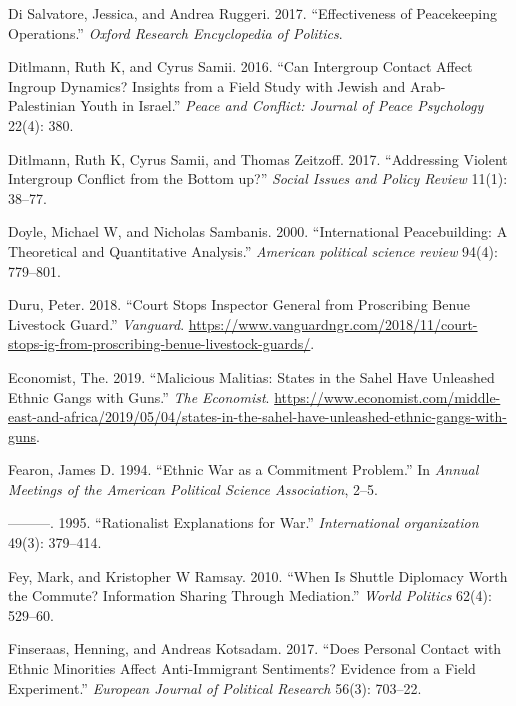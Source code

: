 \documentclass[11pt]{article}
\begin{document}
\hypertarget{ref-di2017effectiveness}{}
Di Salvatore, Jessica, and Andrea Ruggeri. 2017. ``Effectiveness of
Peacekeeping Operations.'' \emph{Oxford Research Encyclopedia of
Politics}.

\hypertarget{ref-ditlmann2016can}{}
Ditlmann, Ruth K, and Cyrus Samii. 2016. ``Can Intergroup Contact Affect
Ingroup Dynamics? Insights from a Field Study with Jewish and
Arab-Palestinian Youth in Israel.'' \emph{Peace and Conflict: Journal of
Peace Psychology} 22(4): 380.

\hypertarget{ref-ditlmann2017addressing}{}
Ditlmann, Ruth K, Cyrus Samii, and Thomas Zeitzoff. 2017. ``Addressing
Violent Intergroup Conflict from the Bottom up?'' \emph{Social Issues
and Policy Review} 11(1): 38--77.

\hypertarget{ref-doyle2000international}{}
Doyle, Michael W, and Nicholas Sambanis. 2000. ``International
Peacebuilding: A Theoretical and Quantitative Analysis.'' \emph{American
political science review} 94(4): 779--801.

\hypertarget{ref-duru2018court}{}
Duru, Peter. 2018. ``Court Stops Inspector General from Proscribing
Benue Livestock Guard.'' \emph{Vanguard}.
\url{https://www.vanguardngr.com/2018/11/court-stops-ig-from-proscribing-benue-livestock-guards/}.

\hypertarget{ref-economist2019militias}{}
Economist, The. 2019. ``Malicious Malitias: States in the Sahel Have
Unleashed Ethnic Gangs with Guns.'' \emph{The Economist}.
\url{https://www.economist.com/middle-east-and-africa/2019/05/04/states-in-the-sahel-have-unleashed-ethnic-gangs-with-guns}.

\hypertarget{ref-fearon1994ethnic}{}
Fearon, James D. 1994. ``Ethnic War as a Commitment Problem.'' In
\emph{Annual Meetings of the American Political Science Association},
2--5.

\hypertarget{ref-fearon1995rationalist}{}
---------. 1995. ``Rationalist Explanations for War.''
\emph{International organization} 49(3): 379--414.

\hypertarget{ref-fey2010shuttle}{}
Fey, Mark, and Kristopher W Ramsay. 2010. ``When Is Shuttle Diplomacy
Worth the Commute? Information Sharing Through Mediation.'' \emph{World
Politics} 62(4): 529--60.

\hypertarget{ref-finseraas2017does}{}
Finseraas, Henning, and Andreas Kotsadam. 2017. ``Does Personal Contact
with Ethnic Minorities Affect Anti-Immigrant Sentiments? Evidence from a
Field Experiment.'' \emph{European Journal of Political Research} 56(3):
703--22.
\end{document}

